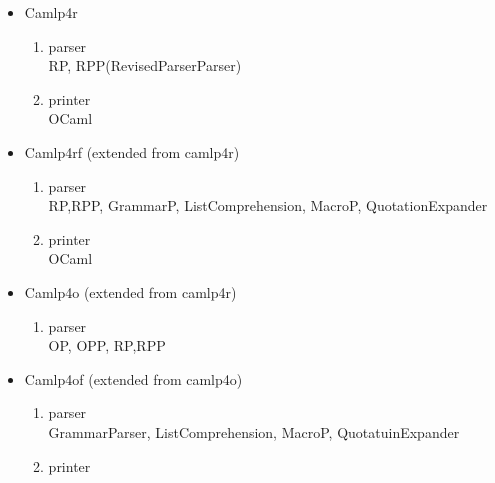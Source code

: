 \begin{itemize}  
\item Camlp4r
    \begin{enumerate}
    \item parser \\
      RP, RPP(RevisedParserParser)
    \item printer \\
      OCaml
    \end{enumerate}
\item Camlp4rf (extended from camlp4r)
    \begin{enumerate}
    \item parser \\
      RP,RPP, GrammarP, ListComprehension, MacroP, QuotationExpander
    \item printer \\
      OCaml
    \end{enumerate}
\item Camlp4o (extended from camlp4r)
    \begin{enumerate}
    \item parser \\
      OP, OPP, RP,RPP
    \end{enumerate}
\item Camlp4of (extended from camlp4o)
    \begin{enumerate}
    \item parser \\
      GrammarParser, ListComprehension, MacroP, QuotatuinExpander
    \item printer 
    \end{enumerate}
\end{itemize}



